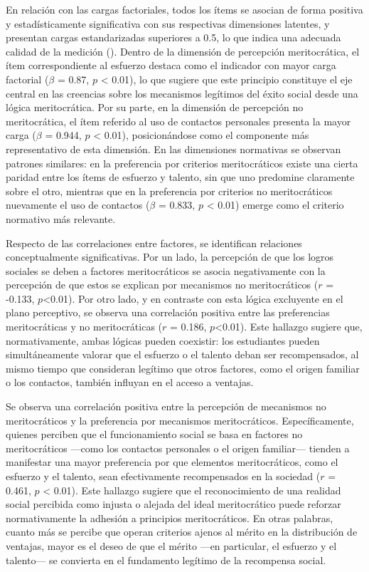 \documentclass[
  12pt,
]{article}
\begin{document}
En relación con las cargas factoriales, todos los ítems se asocian de
forma positiva y estadísticamente significativa con sus respectivas
dimensiones latentes, y presentan cargas estandarizadas superiores a
0.5, lo que indica una adecuada calidad de la medición
(). Dentro de la
dimensión de percepción meritocrática, el ítem correspondiente al
esfuerzo destaca como el indicador con mayor carga factorial (\(\beta\)
= 0.87, \(p\) \textless{} 0.01), lo que sugiere que este principio
constituye el eje central en las creencias sobre los mecanismos
legítimos del éxito social desde una lógica meritocrática. Por su parte,
en la dimensión de percepción no meritocrática, el ítem referido al uso
de contactos personales presenta la mayor carga (\(\beta\) = 0.944,
\(p\) \textless{} 0.01), posicionándose como el componente más
representativo de esta dimensión. En las dimensiones normativas se
observan patrones similares: en la preferencia por criterios
meritocráticos existe una cierta paridad entre los ítems de esfuerzo y
talento, sin que uno predomine claramente sobre el otro, mientras que en
la preferencia por criterios no meritocráticos nuevamente el uso de
contactos (\(\beta\) = 0.833, \(p\) \textless{} 0.01) emerge como el
criterio normativo más relevante.

Respecto de las correlaciones entre factores, se identifican relaciones
conceptualmente significativas. Por un lado, la percepción de que los
logros sociales se deben a factores meritocráticos se asocia
negativamente con la percepción de que estos se explican por mecanismos
no meritocráticos (\(r\) = -0.133, \(p\)\textless0.01). Por otro lado, y
en contraste con esta lógica excluyente en el plano perceptivo, se
observa una correlación positiva entre las preferencias meritocráticas y
no meritocráticas (\(r\) = 0.186, \(p\)\textless0.01). Este hallazgo
sugiere que, normativamente, ambas lógicas pueden coexistir: los
estudiantes pueden simultáneamente valorar que el esfuerzo o el talento
deban ser recompensados, al mismo tiempo que consideran legítimo que
otros factores, como el origen familiar o los contactos, también
influyan en el acceso a ventajas.

Se observa una correlación positiva entre la percepción de mecanismos no
meritocráticos y la preferencia por mecanismos meritocráticos.
Específicamente, quienes perciben que el funcionamiento social se basa
en factores no meritocráticos ---como los contactos personales o el
origen familiar--- tienden a manifestar una mayor preferencia por que
elementos meritocráticos, como el esfuerzo y el talento, sean
efectivamente recompensados en la sociedad (\(r\) = 0.461, \(p\)
\textless{} 0.01). Este hallazgo sugiere que el reconocimiento de una
realidad social percibida como injusta o alejada del ideal meritocrático
puede reforzar normativamente la adhesión a principios meritocráticos.
En otras palabras, cuanto más se percibe que operan criterios ajenos al
mérito en la distribución de ventajas, mayor es el deseo de que el
mérito ---en particular, el esfuerzo y el talento--- se convierta en el
fundamento legítimo de la recompensa social.
\end{document}
